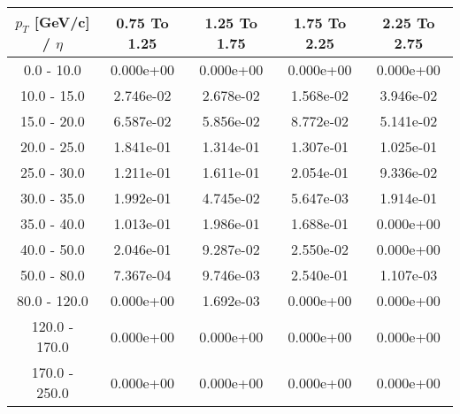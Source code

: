 \begin{tabular}{|c|c|c|c|c|}\hline 
$p_T$ [GeV/c] / $\eta$  & 0.75 To 1.25 & 1.25 To 1.75 & 1.75 To 2.25 & 2.25 To 2.75 \\ 
 \hline 
0.0 - 10.0 & 0.000e+00 & 0.000e+00 & 0.000e+00 & 0.000e+00 \\ 
10.0 - 15.0 & 2.746e-02 & 2.678e-02 & 1.568e-02 & 3.946e-02 \\ 
15.0 - 20.0 & 6.587e-02 & 5.856e-02 & 8.772e-02 & 5.141e-02 \\ 
20.0 - 25.0 & 1.841e-01 & 1.314e-01 & 1.307e-01 & 1.025e-01 \\ 
25.0 - 30.0 & 1.211e-01 & 1.611e-01 & 2.054e-01 & 9.336e-02 \\ 
30.0 - 35.0 & 1.992e-01 & 4.745e-02 & 5.647e-03 & 1.914e-01 \\ 
35.0 - 40.0 & 1.013e-01 & 1.986e-01 & 1.688e-01 & 0.000e+00 \\ 
40.0 - 50.0 & 2.046e-01 & 9.287e-02 & 2.550e-02 & 0.000e+00 \\ 
50.0 - 80.0 & 7.367e-04 & 9.746e-03 & 2.540e-01 & 1.107e-03 \\ 
80.0 - 120.0 & 0.000e+00 & 1.692e-03 & 0.000e+00 & 0.000e+00 \\ 
120.0 - 170.0 & 0.000e+00 & 0.000e+00 & 0.000e+00 & 0.000e+00 \\ 
170.0 - 250.0 & 0.000e+00 & 0.000e+00 & 0.000e+00 & 0.000e+00 \\ 
 \hline 
\end{tabular} 
